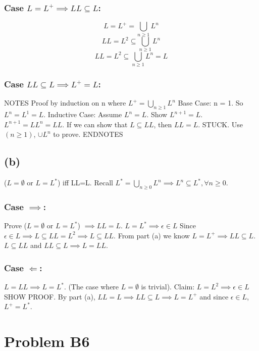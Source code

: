 \documentclass[12pt]{article}
\begin{document}
\subsubsection*{Case $L=L^+ \implies LL \subseteq L$:}
$$L = L^+ = \bigcup\limits_{n\ge1} L^n$$
$$LL = L^2 \subseteq \bigcup\limits_{n\ge1} L^n$$
$$LL = L^2 \subseteq \bigcup\limits_{n\ge1} L^n = L$$

\subsubsection*{Case $LL \subseteq L \implies L^+ = L$:}
NOTES
\newline
Proof by induction on n where $L^+ = \bigcup\limits_{n\ge1} L^n$
Base Case: n = 1. So $L^n = L^1  = L$.
Inductive Case: Assume $L^n = L$.
Show $L^{n+1} =L$. 
\newline 
$L^{n+1} = LL^{n} = LL$. If we can show that $L \subseteq LL$, then 
$LL=L$.
STUCK. Use $(n \ge 1)$, $ \cup L^n$ to prove.
ENDNOTES

\subsection*{(b)}
($L=\emptyset$ or $L=L^*$) iff LL=L.
Recall $L^\ast = \bigcup\limits_{n \ge 0} L^n \implies L^n \subseteq L^\ast,
\forall n\ge 0$.
\newline
\subsubsection*{Case $\implies$:}
Prove ($L=\emptyset$ or $L=L^*$)
$\implies LL=L$. $L = L^\ast \implies {\epsilon } \in L$
Since ${\epsilon } \in L \implies L \subseteq LL = L^2 \implies L \subseteq LL$.
From part (a) we know $L=L^+ \implies LL \subseteq L$. 
$L \subseteq LL$ and $LL \subseteq L \implies L = LL$.

\subsubsection*{Case $\Longleftarrow$:} 
$L=LL \implies L = L^\ast$.
(The case where $L= \emptyset$ is trivial).
Claim: $L=L^2 \implies {\epsilon } \in L$ SHOW PROOF.
By part (a), $LL=L \implies LL \subseteq L \implies
L = L^+$ and since ${\epsilon } \in L$, $L^+=L^\ast$.

\section*{Problem B6}
\end{document}
